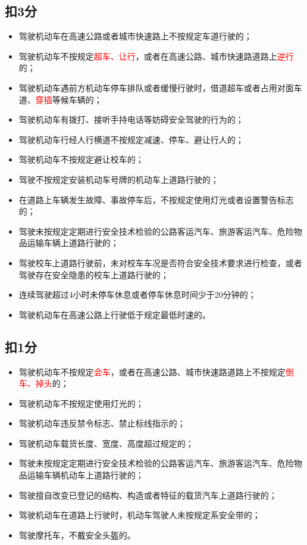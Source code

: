 \subsection*{扣3分}

\begin{itemize}
    \item 驾驶机动车在高速公路或者城市快速路上不按规定车道行驶的；
    \item 驾驶机动车不按规定\textcolor{red}{超车、让行}，或者在高速公路、城市快速路道路上\textcolor{red}{逆行}的；
    \item 驾驶机动车遇前方机动车停车排队或者缓慢行驶时，借道超车或者占用对面车道、\textcolor{red}{穿插}等候车辆的；
    \item 驾驶机动车有拨打、接听手持电话等妨碍安全驾驶的行为的；
    \item 驾驶机动车行经人行横道不按规定减速、停车、避让行人的；
    \item 驾驶机动车不按规定避让校车的；
    \item 驾驶不按规定安装机动车号牌的机动车上道路行驶的；
    \item 在道路上车辆发生故障、事故停车后，不按规定使用灯光或者设置警告标志的；
    \item 驾驶未按规定定期进行安全技术检验的公路客运汽车、旅游客运汽车、危险物品运输车辆上道路行驶的；
    \item 驾驶校车上道路行驶前，未对校车车况是否符合安全技术要求进行检查，或者驾驶存在安全隐患的校车上道路行驶的；
    \item 连续驾驶超过4小时未停车休息或者停车休息时间少于20分钟的；
    \item 驾驶机动车在高速公路上行驶低于规定最低时速的。
\end{itemize}

\subsection*{扣1分}

\begin{itemize}
    \item 驾驶机动车不按规定\textcolor{red}{会车}，或者在高速公路、城市快速路道路上不按规定\textcolor{red}{倒车、掉头}的；
    \item 驾驶机动车不按规定使用灯光的；
    \item 驾驶机动车违反禁令标志、禁止标线指示的；
    \item 驾驶机动车载货长度、宽度、高度超过规定的；
    \item 驾驶未按规定定期进行安全技术检验的公路客运汽车、旅游客运汽车、危险物品运输车辆机动车上道路行驶的；
    \item 驾驶擅自改变已登记的结构、构造或者特征的载货汽车上道路行驶的；
    \item 驾驶机动车在道路上行驶时，机动车驾驶人未按规定系安全带的；
    \item 驾驶摩托车，不戴安全头盔的。
\end{itemize}